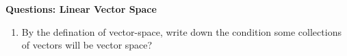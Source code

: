 \documentclass{article}[12pt, a4paper]
\begin{document}
\begin{center}
	\textbf{Questions: Linear Vector Space}
\end{center}

\begin{enumerate}
	\item By the defination of vector-space, write down the condition some collections of vectors
	will be vector space?
\end{enumerate}
\end{document}
